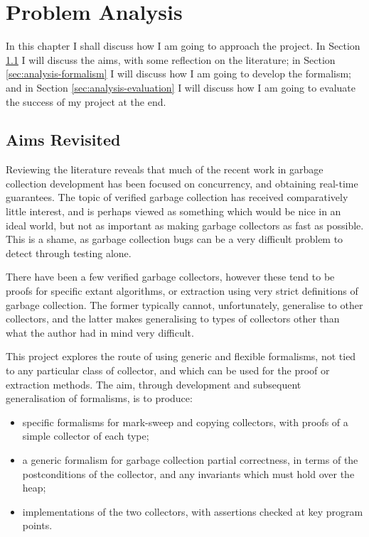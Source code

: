 \chapter{Problem Analysis}
\label{sec:analysis}

In this chapter I shall discuss how I am going to approach the
project. In Section \ref{sec:analysis-aims} I will discuss the aims,
with some reflection on the literature; in Section
\ref{sec:analysis-formalism} I will discuss how I am going to develop
the formalism; and in Section \ref{sec:analysis-evaluation} I will
discuss how I am going to evaluate the success of my project at the
end.

\section{Aims Revisited}
\label{sec:analysis-aims}

Reviewing the literature reveals that much of the recent work in
garbage collection development has been focused on concurrency, and
obtaining real-time guarantees. The topic of verified garbage
collection has received comparatively little interest, and is perhaps
viewed as something which would be nice in an ideal world, but not as
important as making garbage collectors as fast as possible. This is a
shame, as garbage collection bugs can be a very difficult problem to
detect through testing alone.

There have been a few verified garbage collectors, however these tend
to be proofs for specific extant algorithms, or extraction using very
strict definitions of garbage collection. The former typically cannot,
unfortunately, generalise to other collectors, and the latter makes
generalising to types of collectors other than what the author had in
mind very difficult.

This project explores the route of using generic and flexible
formalisms, not tied to any particular class of collector, and which
can be used for the proof or extraction methods. The aim, through
development and subsequent generalisation of formalisms, is to
produce:

\begin{itemize}
  \item specific formalisms for mark-sweep and copying collectors,
    with proofs of a simple collector of each type;

  \item a generic formalism for garbage collection partial
    correctness, in terms of the postconditions of the collector, and
    any invariants which must hold over the heap;

  \item implementations of the two collectors, with assertions checked
    at key program points.
\end{itemize}

